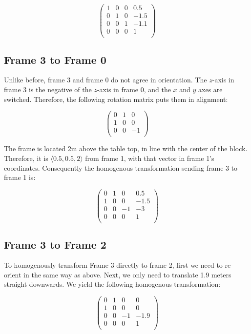 \documentclass{article}
\begin{document}
\[ \left( 
	\begin{matrix}
		1 & 0 & 0 & 0.5\\
		0 & 1 & 0 & -1.5\\
		0 & 0 & 1 & -1.1\\
		0 & 0 & 0 & 1 \\
	\end{matrix} \right) \]

\subsection{Frame 3 to Frame 0}

Unlike before, frame 3 and frame 0 do not agree in orientation.
The $z$-axis in frame 3 is the negative of the $z$-axis in frame 0,
	and the $x$ and $y$ axes are switched.
Therefore, the following rotation matrix puts them in alignment:

\[ \left(
	\begin{matrix}
	0 & 1 & 0 \\
	1 & 0 & 0 \\
	0 & 0 & -1 \\
	\end{matrix} \right) \]

The frame is located 2m above the table top, in line with the center
	of the block.
Therefore, it is $\langle 0.5, 0.5, 2 \rangle$ from frame 1, with that
	vector in frame 1's coordinates.
Consequently the homogenous transformation sending frame 3 to frame 1 is:

\[ \left( 
	\begin{matrix}
		0 & 1 & 0 & 0.5\\
		1 & 0 & 0 & -1.5\\
		0 & 0 & -1 & -3\\
		0 & 0 & 0 & 1 \\
	\end{matrix} \right) \]

\subsection{Frame 3 to Frame 2}

To homogenously transform Frame 3 directly to frame 2, first we need to re-orient
	in the same way as above.
Next, we only need to translate 1.9 meters straight downwards.
We yield the following homogenous transformation:

\[ \left( 
	\begin{matrix}
		0 & 1 & 0 & 0\\
		1 & 0 & 0 & 0\\
		0 & 0 & -1 & -1.9\\
		0 & 0 & 0 & 1 \\
	\end{matrix} \right) \]
\end{document}

